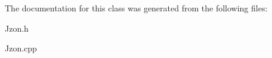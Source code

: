 The documentation for this class was generated from the following files\-:\begin{DoxyCompactItemize}
\item 
Jzon.\-h\item 
Jzon.\-cpp\end{DoxyCompactItemize}
